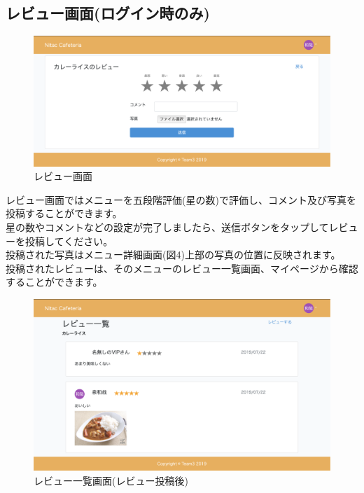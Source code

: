 \documentclass[a4paper]{jsarticle}
\begin{document}
\subsection{レビュー画面(ログイン時のみ)}
\begin{figure}[htbp]
\centering
	\caption{レビュー画面}
	\includegraphics[scale = 0.225]{image/review2.png}
\end{figure}
レビュー画面ではメニューを五段階評価(星の数)で評価し、コメント及び写真を投稿することができます。\\
星の数やコメントなどの設定が完了しましたら、送信ボタンをタップしてレビューを投稿してください。\\
投稿された写真はメニュー詳細画面(図4)上部の写真の位置に反映されます。\\
投稿されたレビューは、そのメニューのレビュー一覧画面、マイページから確認することができます。\\
\begin{figure}[htbp]
	\centering
		\caption{レビュー一覧画面(レビュー投稿後)}
		\includegraphics[scale = 0.225]{image/review_after_create.png}
	\end{figure}
	\newpage
\end{document}

